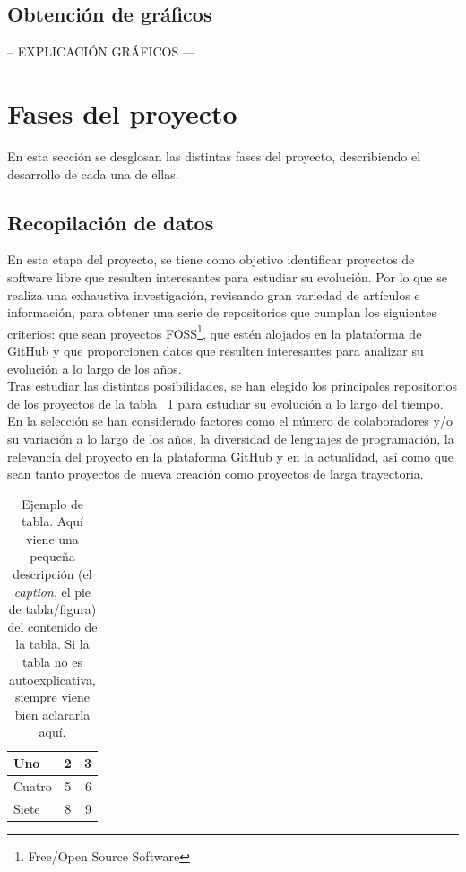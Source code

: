 \documentclass[a4paper, 12pt]{book}
\begin{document}
\subsection{Obtención de gráficos}
\label{subsec:programa-graficos}

-- EXPLICACIÓN GRÁFICOS ---

\section{Fases del proyecto} 
\label{sec:fases-proyecto}

En esta sección se desglosan las distintas fases del proyecto, describiendo el desarrollo de cada una de ellas.

\subsection{Recopilación de datos}
\label{subsec:recopilacion}

En esta etapa del proyecto, se tiene como objetivo identificar proyectos de software libre que resulten interesantes para estudiar su evolución. Por lo que se realiza una exhaustiva investigación, revisando gran variedad de artículos e
información, para obtener una serie de repositorios que cumplan los siguientes criterios: que sean proyectos FOSS\footnote{Free/Open Source Software}, que estén alojados en la plataforma de GitHub y que proporcionen datos que resulten interesantes
para analizar su evolución a lo largo de los años.
\\Tras estudiar las distintas posibilidades, se han elegido los principales repositorios de los proyectos de la tabla ~\ref{tab:repositorios} para estudiar su evolución a lo largo del tiempo. En la selección se han considerado factores como el número de colaboradores y/o
su variación a lo largo de los años, la diversidad de lenguajes de programación, la relevancia del proyecto en la plataforma GitHub y en la actualidad, así como que sean tanto proyectos de nueva creación como proyectos de larga trayectoria.

\begin{table}
 \begin{center}
  \begin{tabular}{ | l | c | r |} %
    \hline
    Uno & 2 & 3 \\ \hline %
    Cuatro & 5 & 6 \\ \hline
    Siete & 8 & 9 \\
    \hline
  \end{tabular}
  \caption{Ejemplo de tabla. Aquí viene una pequeña descripción (el \emph{caption}, el pie de tabla/figura) del contenido de la tabla. Si la tabla no es autoexplicativa, siempre viene bien aclararla aquí.}
  \label{tab:repositorios}
 \end{center}
\end{table}
\end{document}
